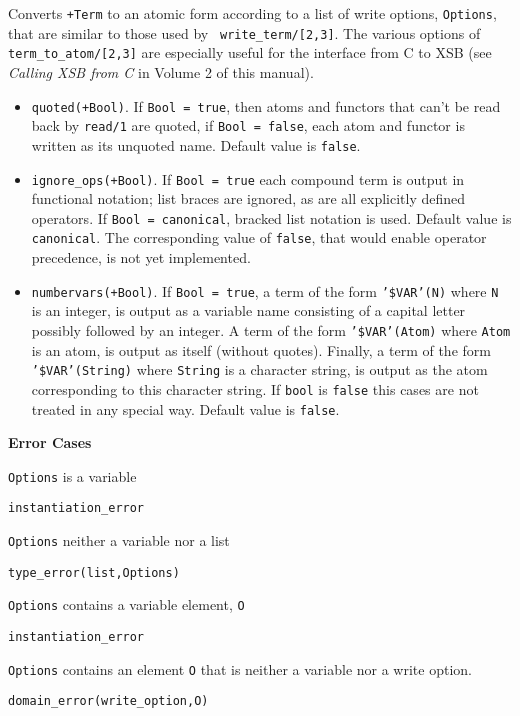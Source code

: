 \begin{description}
%
Converts {\tt +Term} to an atomic form according to a list of write
options, {\tt Options}, that are similar to those used by {\tt
write\_term/[2,3]}.  The various options of {\tt
term\_to\_atom/[2,3]} are especially useful for the interface from C
to XSB (see {\em Calling XSB from C} in Volume 2 of this manual).
%
\begin{itemize}
%
\item {\tt quoted(+Bool)}.  If {\tt Bool = true}, then atoms and
    functors that can't be read back by {\tt read/1} are quoted, if
    {\tt Bool = false}, each atom and functor is written as its
    unquoted name. Default value is {\tt false}.
%
\item {\tt ignore\_ops(+Bool)}. If {\tt Bool = true} each compound term
is output in functional notation; list braces are ignored, as are all
explicitly defined operators.  If {\tt Bool = canonical}, bracked list
notation is used.  Default value is {\tt canonical}.  The
corresponding value of {\tt false}, that would enable operator
precedence, is not yet implemented.
%
 \item {\tt numbervars(+Bool)}.  If {\tt Bool = true}, a term of the
form {\tt '\$VAR'(N)} where {\tt N} is an integer, is output as a
variable name consisting of a capital letter possibly followed by an
integer.  A term of the form {\tt '\$VAR'(Atom)} where {\tt Atom} is an
atom, is output as itself (without quotes).  Finally, a term of the
form {\tt '\$VAR'(String)} where {\tt String} is a character string, is
output as the atom corresponding to this character string.  If
{\tt bool} is {\tt false} this cases are not treated in any special
way.  Default value is {\tt false}.
%
\end{itemize}

{\bf Error Cases} 
\bi
\item 	{\tt Options} is a variable
\bi
\item    {\tt instantiation\_error}
\ei
\item 	{\tt Options} neither a variable nor a list
\bi
\item    {\tt type\_error(list,Options)}
\ei
\item 	{\tt Options} contains a variable element, {\tt O}
\bi
\item    {\tt instantiation\_error}
\ei
\item 	{\tt Options} contains an element {\tt O} that is neither a variable
nor a write option.
\bi
\item    {\tt domain\_error(write\_option,O)}
\ei
\ei


\end{description}
